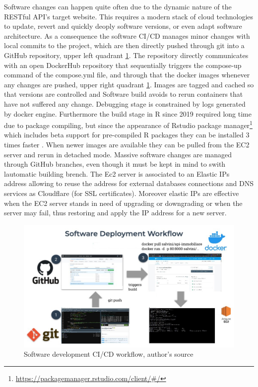 \documentclass[
  12pt,
  a4paper,
  oneside]{book}
\DeclareRobustCommand{\href}[2]{#2\footnote{\url{#1}}}
\theoremstyle{definition}
\theoremstyle{definition}
\theoremstyle{definition}
\theoremstyle{remark}
\begin{document}
Software changes can happen quite often due to the dynamic nature of the RESTful API's target website. This requires a modern stack of cloud technologies to update, revert and quickly deoply software versions, or even adapt software architecture. As a consequence the software CI/CD manages minor changes with local commits to the project, which are then directly pushed through git into a GitHub repository, upper left quadrant \ref{fig:sfmap}. The repository directly communicates with an open DockerHub repository that sequentially triggers the compose-up command of the compose.yml file, and through that the docker images whenever any changes are pushed, upper right quadrant \ref{fig:sfmap}. Images are tagged and cached so that versions are controlled and Software build avoids to rerun containers that have not suffered any change. Debugging stage is constrained by logs generated by docker engine. Furthermore the build stage in R since 2019 required long time due to package compiling, but since the appearance of Rstudio \href{https://packagemanager.rstudio.com/client/\#/}{package manager} which includes beta support for pre-compiled R packages they can be installed 3 times faster \citep{nolispmanager}.
When newer images are available they can be pulled from the EC2 server and rerun in detached mode. Massive software changes are managed through GitHub branches, even though it must be kept in mind to swith lautomatic building brench. The Ec2 server is associated to an Elastic IPs address allowing to reuse the address for external databases connections and DNS services as Cloudflare (for SSL certificates). Moreover elastic IPs are effective when the EC2 server stands in need of upgrading or downgrading or when the server may fail, thus restoring and apply the IP address for a new server.

\begin{figure}
\centering
\includegraphics{images/SoftwareDevWF.jpg}
\caption{\label{fig:sfmap}Software development CI/CD workflow, author's source}
\end{figure}
\end{document}
